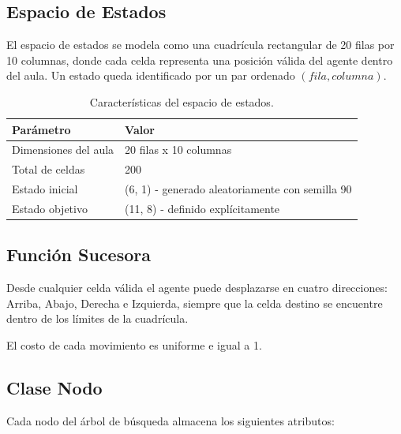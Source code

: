 \documentclass{article}
\begin{document}
\subsection{Espacio de Estados}

El espacio de estados se modela como una cuadrícula rectangular de
20 filas por 10 columnas, donde cada celda representa una posición
válida del agente dentro del aula. Un estado queda identificado por
un par ordenado $(fila, columna)$.

\begin{table}[H]
\centering

\begin{tabular}{|l|p{9cm}|}
\hline
\textbf{Parámetro} & \textbf{Valor} \\ \hline

Dimensiones del aula &
20 filas x 10 columnas \\ \hline

Total de celdas &
200 \\ \hline

Estado inicial &
(6, 1) - generado aleatoriamente con semilla 90 \\ \hline

Estado objetivo &
(11, 8) - definido explícitamente \\ \hline

\end{tabular}

\caption{Características del espacio de estados.}

\end{table}

\subsection{Función Sucesora}

Desde cualquier celda válida el agente puede desplazarse en cuatro
direcciones: Arriba, Abajo, Derecha e Izquierda, siempre que la celda
destino se encuentre dentro de los límites de la cuadrícula.

El costo de cada movimiento es uniforme e igual a 1.

\subsection{Clase Nodo}

Cada nodo del árbol de búsqueda almacena los siguientes atributos:
\end{document}
